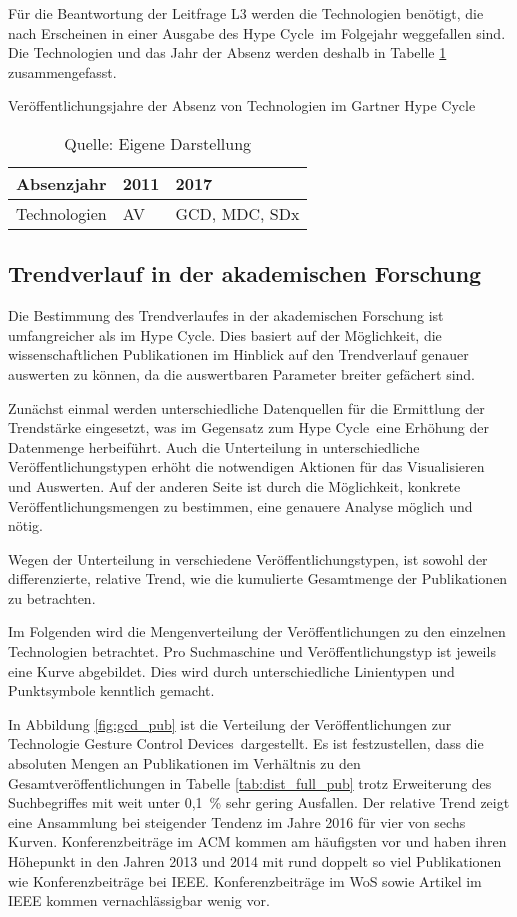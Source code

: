 Für die Beantwortung der Leitfrage L3 werden die Technologien benötigt, die nach Erscheinen in einer Ausgabe des \glqq Hype Cycle\grqq~im Folgejahr weggefallen sind. Die Technologien und das Jahr der Absenz werden deshalb in Tabelle \ref{tab:ghc_abscence} zusammengefasst.

\begin{table}
	\caption{Veröffentlichungsjahre der Absenz von Technologien im \glqq Gartner Hype Cycle\grqq}
	\selectfont
	\centering
	\label{tab:ghc_abscence}
	\begin{tabularx}{\linewidth}{X|XX}
		Absenzjahr & 2011 & 2017  \\
		\hline
		Technologien & \acs{AV} & \acs{GCD}, \acs{MDC}, \acs{SDx} \\
	\end{tabularx}
	\caption*{Quelle: Eigene Darstellung}
\end{table}

\subsection{Trendverlauf in der akademischen Forschung}
Die Bestimmung des Trendverlaufes in der akademischen Forschung ist umfangreicher als im \glqq Hype Cycle\grqq. Dies basiert auf der Möglichkeit, die wissenschaftlichen Publikationen im Hinblick auf den Trendverlauf genauer auswerten zu können, da die auswertbaren Parameter breiter gefächert sind.

Zunächst einmal werden unterschiedliche Datenquellen für die Ermittlung der Trendstärke eingesetzt, was im Gegensatz zum \glqq Hype Cycle\grqq~eine Erhöhung der Datenmenge herbeiführt. Auch die Unterteilung in unterschiedliche Veröffentlichungstypen erhöht die notwendigen Aktionen für das Visualisieren und Auswerten. Auf der anderen Seite ist durch die Möglichkeit, konkrete Veröffentlichungsmengen zu bestimmen, eine genauere Analyse möglich und nötig.

Wegen der Unterteilung in verschiedene Veröffentlichungstypen, ist sowohl der differenzierte, relative Trend, wie die kumulierte Gesamtmenge der Publikationen zu betrachten.

Im Folgenden wird die Mengenverteilung der Veröffentlichungen zu den einzelnen Technologien betrachtet. Pro Suchmaschine und Veröffentlichungstyp ist jeweils eine Kurve abgebildet. Dies wird durch unterschiedliche Linientypen und Punktsymbole kenntlich gemacht.

In Abbildung \ref{fig:gcd_pub} ist die Verteilung der Veröffentlichungen zur Technologie \glqq Gesture Control Devices\grqq~dargestellt. Es ist festzustellen, dass die absoluten Mengen an Publikationen im Verhältnis zu den Gesamtveröffentlichungen in Tabelle \ref{tab:dist_full_pub} trotz Erweiterung des Suchbegriffes mit weit unter 0,1~\% sehr gering Ausfallen. Der relative Trend zeigt eine Ansammlung bei steigender Tendenz im Jahre 2016 für vier von sechs Kurven. Konferenzbeiträge im \ac{ACM} kommen am häufigsten vor und haben ihren Höhepunkt in den Jahren 2013 und 2014 mit rund doppelt so viel Publikationen wie Konferenzbeiträge bei \ac{IEEE}. Konferenzbeiträge im \ac{WoS} sowie Artikel im \ac{IEEE} kommen vernachlässigbar wenig vor.

